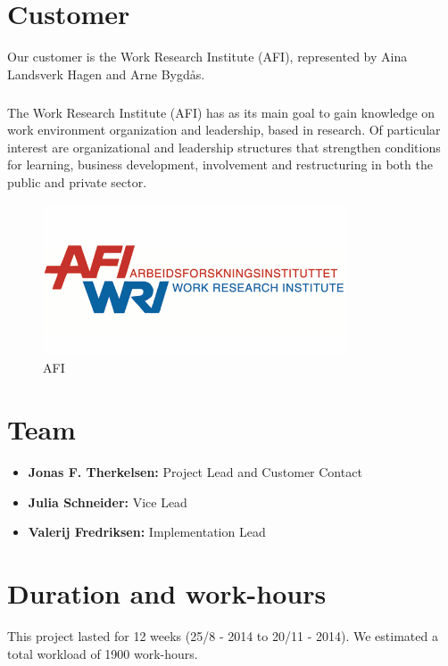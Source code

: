 \section{Customer}
Our customer is the Work Research Institute (AFI), represented by Aina Landsverk Hagen and Arne Bygd\aa s.
\subparagraph{}The Work Research Institute (AFI) has as its main goal to gain knowledge on work environment organization and leadership, based in research. Of particular interest are organizational and leadership structures that strengthen conditions for learning, business development, involvement and restructuring in both the public and private sector.\\
\begin{figure}[ht!]
\centering
\includegraphics[width=90mm]{./Introduction/img/afi.png}
\caption{AFI \label{overflow}}
\end{figure}

\section{Team}
\begin{itemize}
\item \textbf{Jonas F. Therkelsen:} Project Lead and Customer Contact
\item \textbf{Julia Schneider:} Vice Lead
\item \textbf{Valerij Fredriksen:} Implementation Lead
\end{itemize}

%

\section{Duration and work-hours} This project lasted for 12 weeks (25/8 - 2014 to 20/11 - 2014). We estimated a total workload of 1900 work-hours.